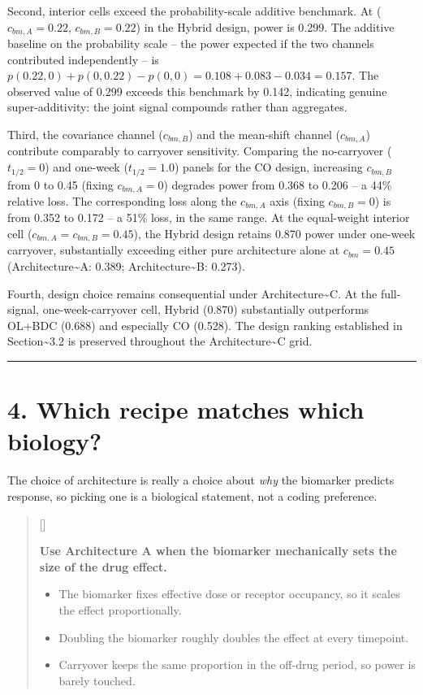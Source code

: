 \documentclass[
  11pt,
]{article}
\newcounter{pgraph}
\newenvironment{bullets}{%
  \stepcounter{pgraph}%
  \begin{quote}\small\sffamily\color[gray]{0.30}%
  {\normalfont\scriptsize\color[gray]{0.58}[\thepgraph]\enspace}}{%
  \end{quote}}
\begin{document}
Second, interior cells exceed the probability-scale additive benchmark.
At (\(c_{bm,A} = 0.22\), \(c_{bm,B} = 0.22\)) in the Hybrid design,
power is 0.299. The additive baseline on the probability scale -- the
power expected if the two channels contributed independently -- is
\(p(0.22,0) + p(0,0.22) - p(0,0)
= 0.108 + 0.083 - 0.034 = 0.157\). The observed value of 0.299 exceeds
this benchmark by 0.142, indicating genuine super-additivity: the joint
signal compounds rather than aggregates.

Third, the covariance channel (\(c_{bm,B}\)) and the mean-shift channel
(\(c_{bm,A}\)) contribute comparably to carryover sensitivity. Comparing
the no-carryover (\(t_{1/2} = 0\)) and one-week (\(t_{1/2} = 1.0\))
panels for the CO design, increasing \(c_{bm,B}\) from 0 to 0.45 (fixing
\(c_{bm,A} = 0\)) degrades power from 0.368 to 0.206 -- a 44\% relative
loss. The corresponding loss along the \(c_{bm,A}\) axis (fixing
\(c_{bm,B} = 0\)) is from 0.352 to 0.172 -- a 51\% loss, in the same
range. At the equal-weight interior cell
(\(c_{bm,A} = c_{bm,B} = 0.45\)), the Hybrid design retains 0.870 power
under one-week carryover, substantially exceeding either pure
architecture alone at \(c_{bm} = 0.45\) (Architecture\textasciitilde A:
0.389; Architecture\textasciitilde B: 0.273).

Fourth, design choice remains consequential under
Architecture\textasciitilde C. At the full-signal, one-week-carryover
cell, Hybrid (0.870) substantially outperforms OL+BDC (0.688) and
especially CO (0.528). The design ranking established in
Section\textasciitilde3.2 is preserved throughout the
Architecture\textasciitilde C grid.

\bigskip\noindent

\rule{\textwidth}{0.4pt}\bigskip

\section{4. Which recipe matches which biology?}

The choice of architecture is really a choice about \emph{why} the
biomarker predicts response, so picking one is a biological statement,
not a coding preference.

\begin{bullets}

\textbf{Use Architecture A when the biomarker mechanically sets the
size of the drug effect.}

\begin{itemize}\setlength{\itemsep}{2pt}\setlength{\parskip}{0pt}
\item The biomarker fixes effective dose or receptor occupancy, so
it scales the effect proportionally.
\item Doubling the biomarker roughly doubles the effect at every
timepoint.
\item Carryover keeps the same proportion in the off-drug period, so power is
barely touched.
\end{itemize}

\end{bullets}
\end{document}
